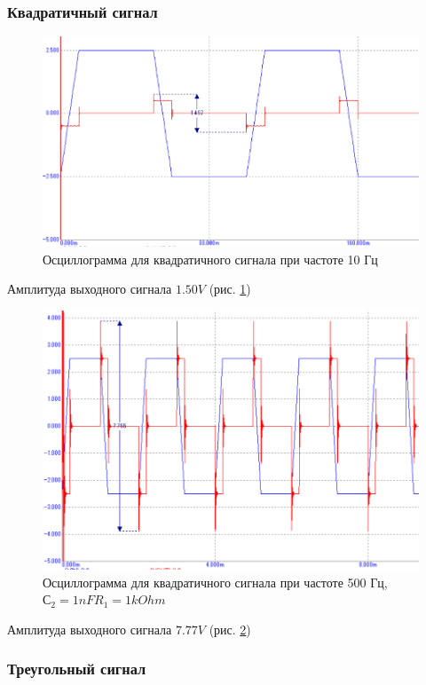 \documentclass[a4paper,14pt]{article}
\begin{document}
\subsubsection{Квадратичный сигнал}

\begin{figure}[H]
	\centering
	\includegraphics[width=0.7\linewidth]{../imgs/tran_square_10Hz_diff}
	\caption{Осциллограмма для квадратичного сигнала при частоте 10 Гц}
	\label{fig:tran_square_10Hz_diff}
\end{figure}

Амплитуда выходного сигнала $1.50V$ (рис. \ref{fig:tran_square_10Hz_diff})

\begin{figure}[H]
	\centering
	\includegraphics[width=0.7\linewidth]{../imgs/tran_square_500Hz_diff}
	\caption{Осциллограмма для квадратичного сигнала при частоте 500 Гц, $С_2=1nF R_1 = 1kOhm$}
	\label{fig:tran_square_500Hz_diff}
\end{figure}

Амплитуда выходного сигнала $7.77V$ (рис. \ref{fig:tran_square_500Hz_diff})

\subsubsection{Треугольный сигнал}
\end{document}

